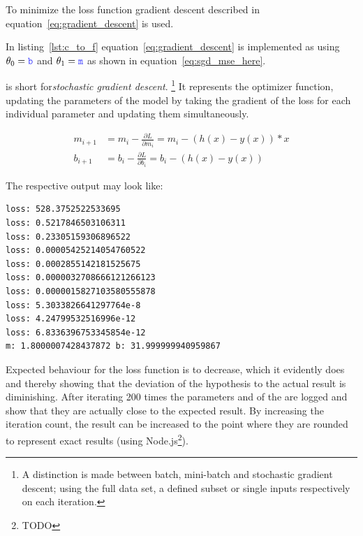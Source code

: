 To minimize the loss function gradient descent described in equation~\eqref{eq:gradient_descent}
is used.

In listing~\ref{lst:c_to_f} equation~\eqref{eq:gradient_descent} is implemented as  using
$\theta_0 = \code{b}$ and $\theta_1= \code{m}$ as shown in equation~\eqref{eq:sgd_mse_here}.

 is short for\textit{stochastic gradient descent}.
\footnote{A distinction is made between batch, mini-batch and stochastic gradient descent;
using the full data set, a defined subset or single inputs respectively on each iteration.}
It represents the optimizer function, updating the
parameters of the model by taking the gradient of the loss for each individual parameter and
updating them simultaneously.

\begin{equation} \label{eq:sgd_mse_here}
\begin{split}
m_{i+1} & = m_i - \frac{\partial L}{\partial m_i} = m_i - (h(x) - y(x)) * x \\
b_{i+1} & = b_i - \frac{\partial L}{\partial b_i} = b_i - (h(x) - y(x))
\end{split}
\end{equation}

The respective output may look like:
\begin{lstlisting}
loss: 528.3752522533695
loss: 0.5217846503106311
loss: 0.23305159306896522
loss: 0.00005425214054760522
loss: 0.0002855142181525675
loss: 0.0000032708666121266123
loss: 0.0000015827103580555878
loss: 5.3033826641297764e-8
loss: 4.24799532516996e-12
loss: 6.8336396753345854e-12
m: 1.8000007428437872 b: 31.999999940959867
\end{lstlisting}

Expected behaviour for the loss function is to decrease, which it evidently
does and thereby showing that the deviation of the hypothesis to the actual result is diminishing.
After iterating 200 times the parameters  and  of the  are logged
and show that they are actually close to the expected result.
By increasing the iteration count, the result can be increased to the point where they are rounded
to represent exact results (using Node.js\footnote{ TODO }).


